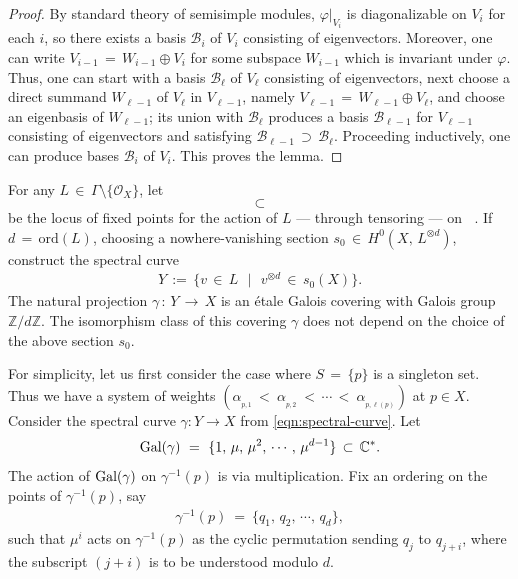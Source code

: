 \documentclass[10pt,reqno]{amsart}
\DeclareMathOperator{\Malpha}{\mc{M}^{\boldsymbol{m,\alpha}}_X(r,\ \xi)}
\DeclareMathOperator{\MLalpha}{\left(\mc{M}^{\boldsymbol{m,\alpha}}_X(r,\ \xi)\right)^L}
\newcommand{\mc}[1]{\mathcal{#1}}
\newcommand{\bb}[1]{\mathbb{#1}}
\theoremstyle{myroman}
\numberwithin{equation}{section}
\begin{document}
	\begin{proof}
		By standard theory of semisimple modules,  $\varphi|_{V_i}$ is diagonalizable on $V_i$ for each $i$, so
		there exists a basis $\mc{B}_{i}$ of $V_{i}$ consisting of eigenvectors. Moreover, one can write
		$V_{i-1}\,=\,W_{i-1}\oplus V_{i}$ for some subspace $W_{i-1}$ which is invariant under $\varphi$. Thus,
		one can start with a basis $\mc{B}_{\ell}$ of $V_{\ell}$ consisting of eigenvectors, next choose a direct
		summand $W_{\ell-1}$ of $V_{\ell}$ in $V_{\ell-1}$, namely $V_{\ell-1} \,=\, W_{\ell-1}\oplus V_{\ell}$, and choose an
		eigenbasis of $W_{\ell-1}$;  its union with $\mc{B}_{\ell}$ produces a basis $\mc{B}_{\ell-1}$ for $V_{\ell-1}$
		consisting of eigenvectors and satisfying $\mc{B}_{\ell-1}\,\supset\,\mc{B}_{\ell}$. Proceeding inductively, one
		can produce bases $\mc{B}_i$ of $V_i$. This proves the lemma.
	\end{proof}
	
	For any $L\,\in \,\Gamma\setminus\{\mathcal{O}_X\}$, let
	\begin{equation*}
		\MLalpha\,\ \subset\,\ \Malpha
	\end{equation*}
	be the locus of fixed points for the action of $L$ --- through tensoring --- on $\Malpha$. 
	If $d\,=\,\text{ord}(L)$, choosing a nowhere-vanishing section $s_0\, \in\, H^0(X,\, L^{\otimes d})$,
	construct the spectral curve
	\begin{align}\label{eqn:spectral-curve}
		Y\, :=\, \{v\, \in\, L\,\ \mid\,\ v^{\otimes d}\, \in\, s_0(X)\}.
	\end{align}
	The natural projection $\gamma\,:\,Y\,\longrightarrow\, X$ is an \'etale Galois covering
	with Galois group ${\mathbb Z}/d{\mathbb Z}$. The isomorphism class of this
	covering $\gamma$ does not depend on the choice of the above section $s_0$.
	
	For simplicity, let us first consider the case where $S\,=\,\{p\}$ is a singleton set.  Thus we have a
	system of weights $(\alpha_{_{p,1}}\,<\ \alpha_{_{p,2}}\ <\,\cdots\,<\  \alpha_{_{p,\ell(p)}})$ at $p\in X$. Consider the spectral curve $\gamma:Y\longrightarrow X$ from \eqref{eqn:spectral-curve}. Let
	$$\textnormal{Gal}(\gamma)\ =\ \{1, \,\mu,\,\mu^2,\,\cdots,\,\mu^{d-1}\}\,\subset \,\bb{C}^*.$$ 
	The action of $\textnormal{Gal}(\gamma)$ on $\gamma^{-1}(p)$ is via multiplication. Fix 
	an ordering on the points of $\gamma^{-1}(p)$, say 
	\begin{align}\label{eqn:fibre}
		\gamma^{-1}(p)\ =\ \{q_1,\,q_2,\,\cdots,\,q_d\},
	\end{align}
	such that $\mu^i$ acts on $\gamma^{-1}(p)$ as the cyclic permutation sending $q_j$ to $q_{j+i}$, where the 
	subscript $(j+i)$ is to be understood modulo $d$.
	
\end{document}
